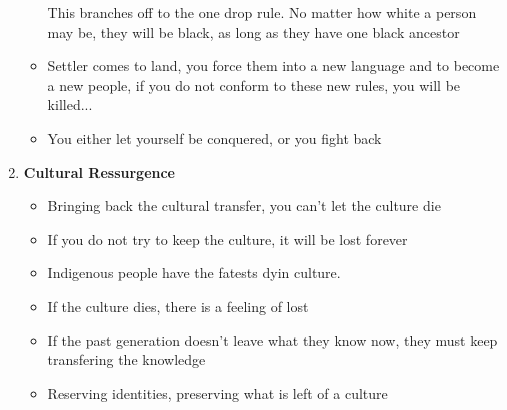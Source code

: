 \documentclass{article}
\begin{document}
\begin{enumerate}
\begin{itemize}
          This branches off to the one drop rule. No matter how white a person may be,
          they will be black, as long as they have one black ancestor
        \item Settler comes to land, you force them into a new language and to become a new people,
          if you do not conform to these new rules, you will be killed...
        \item You either let yourself be conquered, or you fight back
      \end{itemize}

    \item \textbf{Cultural Ressurgence}
      \begin{itemize}
        \item Bringing back the cultural transfer, you can't let the culture die
        \item If you do not try to keep the culture, it will be lost forever
        \item Indigenous people have the fatests dyin culture.
        \item If the culture dies, there is a feeling of lost
        \item If the past generation doesn't leave what they know now,
          they must keep transfering the knowledge
        \item Reserving identities, preserving what is left of a culture
      \end{itemize}

  \end{enumerate}
\end{document}
